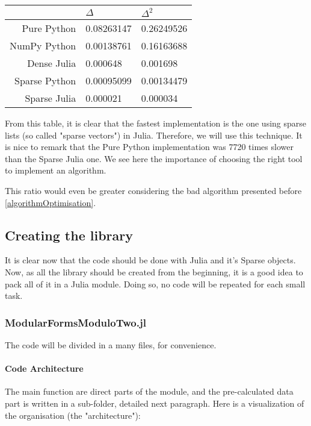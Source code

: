 \begin{center}
	\begin{tabular}{r||l|l}
		 & $\Delta$ & $\Delta^2$\\
		\hline\hline
		Pure Python   & 0.08263147 & 0.26249526 \\
		NumPy Python  & 0.00138761 & 0.16163688 \\
		Dense Julia   & 0.000648   & 0.001698   \\
		Sparse Python & 0.00095099 & 0.00134479 \\
		Sparse Julia  & 0.000021   & 0.000034   \\
	\end{tabular}
\end{center}

From this table, it is clear that the fastest implementation is the one using sparse lists (so called "sparse vectors") in Julia.
Therefore, we will use this technique.
It is nice to remark that the Pure Python implementation was 7720 times slower than the Sparse Julia one.
We see here the importance of choosing the right tool to implement an algorithm.

This ratio would even be greater considering the bad algorithm presented before \ref{algorithmOptimisation}.



\subsection{Creating the library}
It is clear now that the code should be done with Julia and it's Sparse objects.
Now, as all the library should be created from the beginning, it is a good idea to pack all of it in a Julia module.
Doing so, no code will be repeated for each small task.



\subsubsection[Main Module]{ModularFormsModuloTwo.jl}
The code will be divided in a many files, for convenience.

\paragraph{Code Architecture}
The main function are direct parts of the module, and the pre-calculated data part is written in a sub-folder, detailed next paragraph.
Here is a visualization of the organisation (the "architecture"):

